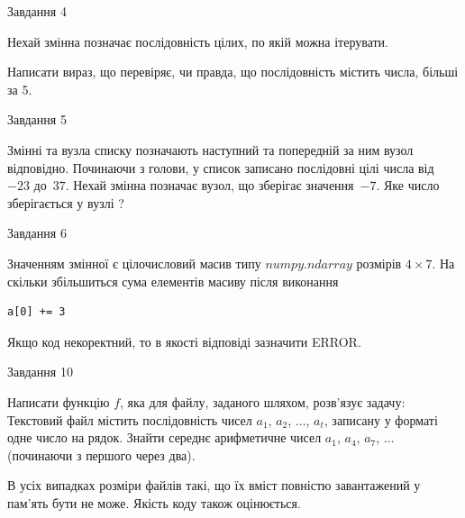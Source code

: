 \documentclass[12pt, ukrainian]{article}
\begin{document}
{               
{\begin{center}Завдання {4}\end{center}}
\vspace{-6mm}
Нехай змінна  позначає послідовність цілих, по якій можна ітерувати.

Написати вираз, що перевіряє, чи правда, що послідовність  містить числа, більші за 5.\par

\vspace{10mm}
               
{\begin{center}Завдання {5}\end{center}}
\vspace{-6mm}
Змінні  та  вузла списку позначають наступний та попередній за ним вузол відповідно. Починаючи з голови, у список записано послідовні цілі числа від~$-23$ до~$37$. Нехай змінна  позначає вузол, що зберігає значення~$-7$.
Яке число зберігається у вузлі  ?\par

               
{\begin{center}Завдання {6}\end{center}}
\vspace{-6mm}
Значенням змінної  є цілочисловий масив типу $numpy.ndarray$ розмірів $4{\times}7$. На скільки збільшиться сума елементів масиву  після виконання
\begin{verbatim}
a[0] += 3
\end{verbatim}


Якщо код некоректний, то в якості відповіді зазначити ERROR.\par

               
{\begin{center}Завдання {10}\end{center}}
\vspace{-6mm}

Написати функцію $f$, яка для файлу, заданого шляхом, розв’язує задачу:\\ Текстовий файл містить послідовність чисел $a_1$, $a_2$, $\ldots$, $a_t$, записану у форматі одне число на рядок. Знайти середнє арифметичне чисел $a_1$, $a_4$, $a_7$, $\ldots$ (починаючи з першого через два).

В усіх випадках розміри файлів такі, що їх вміст повністю завантажений у пам'ять бути не може. Якість коду також оцінюється.



}
\end{document}
